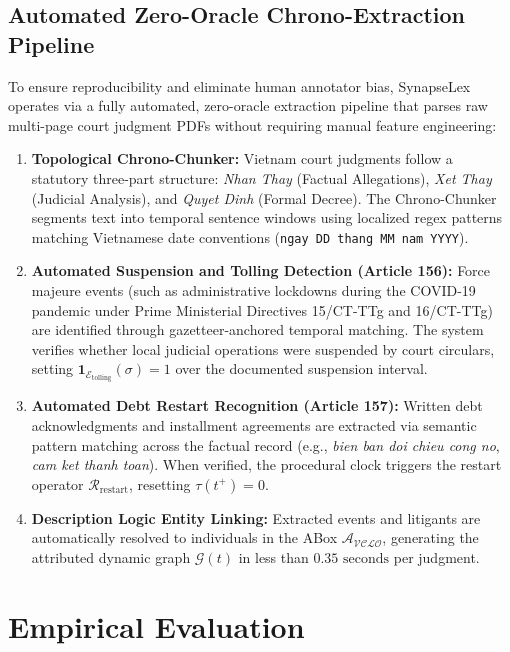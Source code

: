 \documentclass[11pt,a4paper]{article}
\begin{document}
\subsection{Automated Zero-Oracle Chrono-Extraction Pipeline}
\label{sec:chrono_pipeline}
To ensure reproducibility and eliminate human annotator bias, SynapseLex operates via a fully automated, zero-oracle extraction pipeline that parses raw multi-page court judgment PDFs without requiring manual feature engineering:

\begin{enumerate}[label=(\roman*)]
    \item \textbf{Topological Chrono-Chunker:} Vietnam court judgments follow a statutory three-part structure: \textit{Nhan Thay} (Factual Allegations), \textit{Xet Thay} (Judicial Analysis), and \textit{Quyet Dinh} (Formal Decree). The Chrono-Chunker segments text into temporal sentence windows using localized regex patterns matching Vietnamese date conventions (\texttt{ngay DD thang MM nam YYYY}).
    \item \textbf{Automated Suspension and Tolling Detection (Article 156):} Force majeure events (such as administrative lockdowns during the COVID-19 pandemic under Prime Ministerial Directives 15/CT-TTg and 16/CT-TTg) are identified through gazetteer-anchored temporal matching. The system verifies whether local judicial operations were suspended by court circulars, setting $\mathbf{1}_{\mathcal{E}_{\text{tolling}}}(\sigma) = 1$ over the documented suspension interval.
    \item \textbf{Automated Debt Restart Recognition (Article 157):} Written debt acknowledgments and installment agreements are extracted via semantic pattern matching across the factual record (e.g., \textit{bien ban doi chieu cong no}, \textit{cam ket thanh toan}). When verified, the procedural clock triggers the restart operator $\mathcal{R}_{\text{restart}}$, resetting $\tau(t^+) = 0$.
    \item \textbf{Description Logic Entity Linking:} Extracted events and litigants are automatically resolved to individuals in the ABox $\mathcal{A}_{\mathcal{VCLO}}$, generating the attributed dynamic graph $\mathcal{G}(t)$ in less than $0.35\text{ seconds}$ per judgment.
\end{enumerate}

\section{Empirical Evaluation}
\label{sec:experiments}
\end{document}
